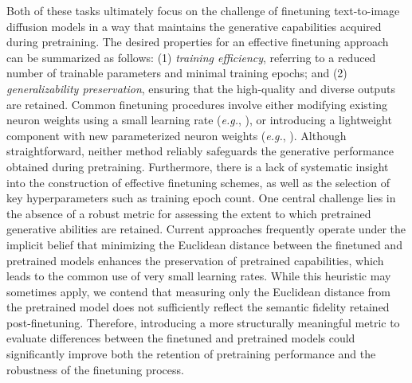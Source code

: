 Both of these tasks ultimately focus on the challenge of finetuning text-to-image diffusion models in a way that maintains the generative capabilities acquired during pretraining. The desired properties for an effective finetuning approach can be summarized as follows: (1) \emph{training efficiency}, referring to a reduced number of trainable parameters and minimal training epochs; and (2) \emph{generalizability preservation}, ensuring that the high-quality and diverse outputs are retained. Common finetuning procedures involve either modifying existing neuron weights using a small learning rate (\emph{e.g.}, \cite{ruiz2023dreambooth}), or introducing a lightweight component with new parameterized neuron weights (\emph{e.g.}, \cite{hulora2022,zhang2023adding}). Although straightforward, neither method reliably safeguards the generative performance obtained during pretraining. Furthermore, there is a lack of systematic insight into the construction of effective finetuning schemes, as well as the selection of key hyperparameters such as training epoch count. One central challenge lies in the absence of a robust metric for assessing the extent to which pretrained generative abilities are retained. Current approaches frequently operate under the implicit belief that minimizing the Euclidean distance between the finetuned and pretrained models enhances the preservation of pretrained capabilities, which leads to the common use of very small learning rates. While this heuristic may sometimes apply, we contend that measuring only the Euclidean distance from the pretrained model does not sufficiently reflect the semantic fidelity retained post-finetuning. Therefore, introducing a more structurally meaningful metric to evaluate differences between the finetuned and pretrained models could significantly improve both the retention of pretraining performance and the robustness of the finetuning process.

